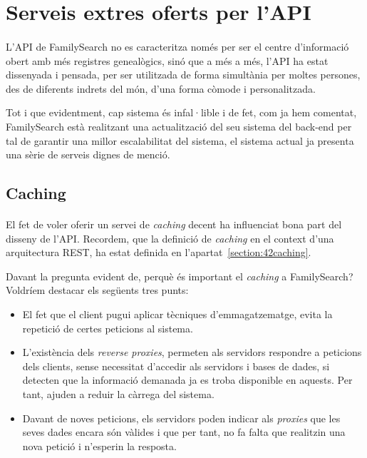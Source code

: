 \section{Serveis extres oferts per l'API}

    \paragraph{}
    L'API de FamilySearch no es caracteritza només per ser el centre d'informació obert amb més registres genealògics, sinó que a més a més, l'API ha estat dissenyada i pensada, per ser utilitzada de forma simultània per moltes persones, des de diferents indrets del món, d'una forma còmode i personalitzada.

    Tot i que evidentment, cap sistema és infal·lible i de fet, com ja hem comentat, FamilySearch està realitzant una actualització del seu sistema del back-end per tal de garantir una millor escalabilitat del sistema, el sistema actual ja presenta una sèrie de serveis dignes de menció.

    \subsection{Caching}

        \paragraph{}
        El fet de voler oferir un servei de \emph{caching} decent ha influenciat bona part del disseny de l'API. Recordem, que la definició de \emph{caching} en el context d'una arquitectura REST, ha estat definida en l'apartat~\ref{section:42caching}.

        Davant la pregunta evident de, perquè és important el \emph{caching} a FamilySearch? Voldríem destacar els següents tres punts:

        \begin{itemize}
            \item El fet que el client pugui aplicar tècniques d'emmagatzematge, evita la repetició de certes peticions al sistema.
            \item L'existència dels \emph{reverse proxies}, permeten als servidors respondre a peticions dels clients, sense necessitat d'accedir als servidors i bases de dades, si detecten que la informació demanada ja es troba disponible en aquests. Per tant, ajuden a reduir la càrrega del sistema.
            \item Davant de noves peticions, els servidors poden indicar als \emph{proxies} que les seves dades encara són vàlides i que per tant, no fa falta que realitzin una nova petició i n'esperin la resposta.
        \end{itemize}


